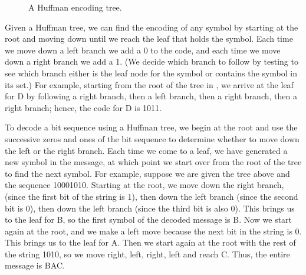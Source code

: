 \begin{figure}[tb]
\label{Figure 2.18}
\centering
\begin{comment}
\heading{Figure 2.18:} A Huffman encoding tree.

\begin{example}
           {A B C D E F G H} 17
                    *
                   / \
                  /   \
                A 8    * {B C D E F G H} 9
            __________/ \_____________
           /                          \
{B C D} 5 *                            * {E F G H} 4
         / \                       ___/ \___
        /   \                     /         \
      B 3    * {C D} 2   {E F} 2 *           * {G H} 2
            / \                 / \         / \
           /   \               /   \       /   \
         C 1   D 1           E 1   F 1   G 1   H 1
\end{example}
\end{comment}

\par\bigskip
\noindent
\heading{Figure 2.18:} A Huffman encoding tree.
\end{figure}

Given a Huffman tree, we can find the encoding of any symbol by starting at the
root and moving down until we reach the leaf that holds the symbol.  Each time
we move down a left branch we add a 0 to the code, and each time we move down a
right branch we add a 1.  (We decide which branch to follow by testing to see
which branch either is the leaf node for the symbol or contains the symbol in
its set.)  For example, starting from the root of the tree in ,
we arrive at the leaf for D by following a right branch, then a left
branch, then a right branch, then a right branch; hence, the code for D is
1011.

To decode a bit sequence using a Huffman tree, we begin at the root and use the
successive zeros and ones of the bit sequence to determine whether to move down
the left or the right branch.  Each time we come to a leaf, we have generated a
new symbol in the message, at which point we start over from the root of the
tree to find the next symbol.  For example, suppose we are given the tree above
and the sequence 10001010.  Starting at the root, we move down the right
branch, (since the first bit of the string is 1), then down the left branch
(since the second bit is 0), then down the left branch (since the third bit is
also 0).  This brings us to the leaf for B, so the first symbol of the decoded
message is B.  Now we start again at the root, and we make a left move because
the next bit in the string is 0.  This brings us to the leaf for A.  Then we
start again at the root with the rest of the string 1010, so we move right,
left, right, left and reach C.  Thus, the entire message is BAC.

